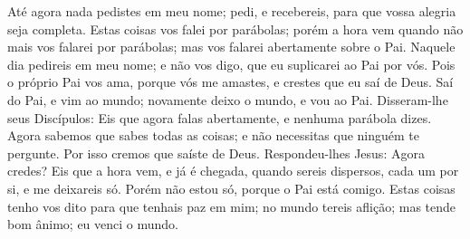 {  Até agora nada pedistes em meu nome; pedi, e recebereis, para que vossa alegria seja completa.
  Estas coisas vos falei por parábolas; porém a hora vem quando não mais vos falarei por parábolas; mas vos falarei abertamente sobre o Pai.
  Naquele dia pedireis em meu nome; e não vos digo, que eu suplicarei ao Pai por vós.
  Pois o próprio Pai vos ama, porque vós me amastes, e crestes que eu saí de Deus.
  Saí do Pai, e vim ao mundo; novamente deixo o mundo, e vou ao Pai.
  Disseram-lhe seus Discípulos: Eis que agora falas abertamente, e nenhuma parábola dizes.
  Agora sabemos que sabes todas as coisas; e não necessitas que ninguém te pergunte. Por isso cremos que saíste de Deus.
  Respondeu-lhes Jesus: Agora credes?
  Eis que a hora vem, e já é chegada, quando sereis dispersos, cada um por si, e me deixareis só. Porém não estou só, porque o Pai está comigo.
  Estas coisas tenho vos dito para que tenhais paz em mim; no mundo tereis aflição; mas tende bom ânimo; eu venci o mundo.
\par }


